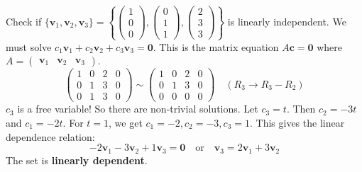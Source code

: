 \documentclass[oneside]{book}
\begin{document}
\begin{example}
Check if $\{\mathbf{v}_1, \mathbf{v}_2, \mathbf{v}_3\} = \left\{ \begin{pmatrix} 1 \\ 0 \\ 0 \end{pmatrix}, \begin{pmatrix} 0 \\ 1 \\ 1 \end{pmatrix}, \begin{pmatrix} 2 \\ 3 \\ 3 \end{pmatrix} \right\}$ is linearly independent.
We must solve $c_1\mathbf{v}_1 + c_2\mathbf{v}_2 + c_3\mathbf{v}_3 = \mathbf{0}$.
This is the matrix equation $A\mathbf{c} = \mathbf{0}$ where $A = \begin{pmatrix} \mathbf{v}_1 & \mathbf{v}_2 & \mathbf{v}_3 \end{pmatrix}$.
\[ \left(\begin{array}{ccc|c} 1 & 0 & 2 & 0 \\ 0 & 1 & 3 & 0 \\ 0 & 1 & 3 & 0 \end{array}\right) \sim \left(\begin{array}{ccc|c} 1 & 0 & 2 & 0 \\ 0 & 1 & 3 & 0 \\ 0 & 0 & 0 & 0 \end{array}\right) \quad (R_3 \to R_3 - R_2) \]
$c_3$ is a free variable! So there are non-trivial solutions.
Let $c_3 = t$. Then $c_2 = -3t$ and $c_1 = -2t$.
For $t=1$, we get $c_1 = -2, c_2 = -3, c_3 = 1$.
This gives the linear dependence relation:
\[ -2\mathbf{v}_1 - 3\mathbf{v}_2 + 1\mathbf{v}_3 = \mathbf{0} \quad \text{or} \quad \mathbf{v}_3 = 2\mathbf{v}_1 + 3\mathbf{v}_2 \]
The set is \textbf{linearly dependent}.
\end{example}
\end{document}

